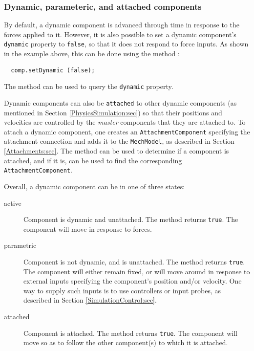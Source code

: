 \subsubsection{Dynamic, parameteric, and attached components}
\label{DynamicVsParametric:sec}

By default, a dynamic component is advanced through time in response
to the forces applied to it. However, it is also possible to set a
dynamic component's {\tt dynamic} property to {\tt false}, so that it
does not respond to force inputs.  As shown in the example above, this
can be done using the method
:
%
\begin{verbatim}
  comp.setDynamic (false);
\end{verbatim}
%
The method
can be used to query the {\tt dynamic} property.

Dynamic components can also be {\tt attached} to other dynamic
components (as mentioned in Section \ref{PhysicsSimulation:sec}) so
that their positions and velocities are controlled by the {\it master}
components that they are attached to.  To attach a dynamic component,
one creates an {\tt AttachmentComponent} specifying the attachment
connection and adds it to the {\tt MechModel}, as described in Section
\ref{Attachments:sec}.  The method
can be used to determine if a component is attached, and if it is,
can be used to find the corresponding {\tt AttachmentComponent}.

Overall, a dynamic component can be in one of three states:

\begin{description}

\item[active]\mbox{}

Component is dynamic and unattached. The method
returns {\tt true}. The component will move in response to forces.

\item[parametric]\mbox{}

Component is not dynamic, and is unattached. 
The method
returns {\tt true}.
The component will either remain
fixed, or will move around in response to external inputs specifying
the component's position and/or velocity. One way to supply such
inputs is to use controllers or input probes, as described in
Section \ref{SimulationControl:sec}.

\item[attached]\mbox{}

Component is attached. The method
returns {\tt true}. The component will move so as to follow the other
component(s) to which it is attached.

\end{description}


